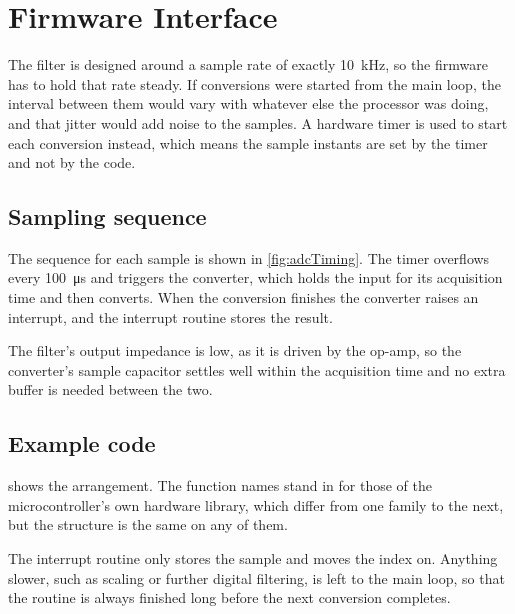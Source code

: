 
\section{Firmware Interface}
\label{sec:firmware}

The filter is designed around a sample rate of exactly
\qty{10}{\kilo\hertz}, so the firmware has to hold that rate steady. If
conversions were started from the main loop, the interval between them would
vary with whatever else the processor was doing, and that jitter would add
noise to the samples. A hardware timer is used to start each conversion
instead, which means the sample instants are set by the timer and not by the
code.

\subsection{Sampling sequence}

The sequence for each sample is shown in \cref{fig:adcTiming}. The timer
overflows every \qty{100}{\micro\second} and triggers the converter, which
holds the input for its acquisition time and then converts. When the
conversion finishes the converter raises an interrupt, and the interrupt
routine stores the result.



The filter's output impedance is low, as it is driven by the op-amp, so the
converter's sample capacitor settles well within the acquisition time and no
extra buffer is needed between the two.

\subsection{Example code}

 shows the arrangement. The function names stand in for
those of the microcontroller's own hardware library, which differ from one
family to the next, but the structure is the same on any of them.



The interrupt routine only stores the sample and moves the index on. Anything
slower, such as scaling or further digital filtering, is left to the main
loop, so that the routine is always finished long before the next conversion
completes.
